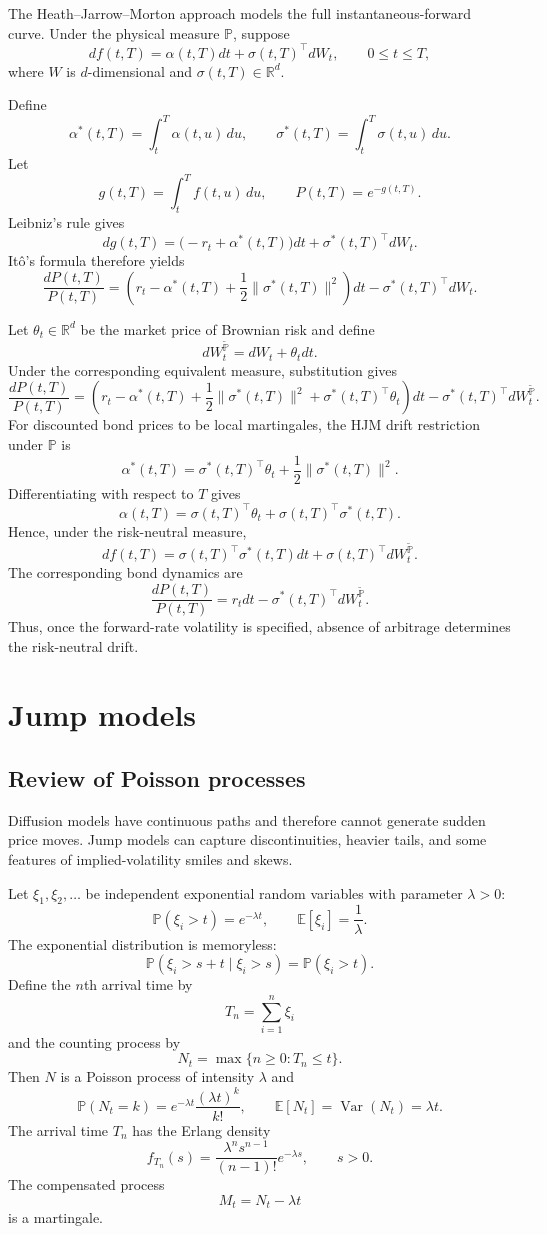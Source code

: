 The Heath--Jarrow--Morton approach models the full instantaneous-forward curve. Under the physical measure $\mathbb{P}$, suppose
\[
df(t,T)
=\alpha(t,T)dt+\sigma(t,T)^\top dW_t,
\qquad 0\leq t\leq T,
\]
where $W$ is $d$-dimensional and $\sigma(t,T)\in\mathbb{R}^d$.

Define
\[
\alpha^*(t,T)=\int_t^T\alpha(t,u)\,du,
\qquad
\sigma^*(t,T)=\int_t^T\sigma(t,u)\,du.
\]
Let
\[
g(t,T)=\int_t^Tf(t,u)\,du,
\qquad
P(t,T)=e^{-g(t,T)}.
\]
Leibniz's rule gives
\[
dg(t,T)
=\bigl(-r_t+\alpha^*(t,T)\bigr)dt
 +\sigma^*(t,T)^\top dW_t.
\]
It\^o's formula therefore yields
\[
\boxed{
\frac{dP(t,T)}{P(t,T)}
=\left(
 r_t-\alpha^*(t,T)
 +\frac12\|\sigma^*(t,T)\|^2
 \right)dt
-\sigma^*(t,T)^\top dW_t.}
\]

Let $\theta_t\in\mathbb{R}^d$ be the market price of Brownian risk and define
\[
dW_t^{\widetilde{\mathbb{P}}}=dW_t+\theta_tdt.
\]
Under the corresponding equivalent measure, substitution gives
\[
\frac{dP(t,T)}{P(t,T)}
=\left(
 r_t-\alpha^*(t,T)
 +\frac12\|\sigma^*(t,T)\|^2
 +\sigma^*(t,T)^\top\theta_t
 \right)dt
-\sigma^*(t,T)^\top dW_t^{\widetilde{\mathbb{P}}}.
\]
For discounted bond prices to be local martingales, the HJM drift restriction under $\mathbb{P}$ is
\[
\boxed{
\alpha^*(t,T)
=\sigma^*(t,T)^\top\theta_t
 +\frac12\|\sigma^*(t,T)\|^2.}
\]
Differentiating with respect to $T$ gives
\[
\alpha(t,T)
=\sigma(t,T)^\top\theta_t
 +\sigma(t,T)^\top\sigma^*(t,T).
\]
Hence, under the risk-neutral measure,
\[
\boxed{
df(t,T)
=\sigma(t,T)^\top\sigma^*(t,T)dt
 +\sigma(t,T)^\top dW_t^{\widetilde{\mathbb{P}}}.}
\]
The corresponding bond dynamics are
\[
\boxed{
\frac{dP(t,T)}{P(t,T)}
=r_tdt-\sigma^*(t,T)^\top dW_t^{\widetilde{\mathbb{P}}}.}
\]
Thus, once the forward-rate volatility is specified, absence of arbitrage determines the risk-neutral drift.

\section{Jump models}

\subsection{Review of Poisson processes}

Diffusion models have continuous paths and therefore cannot generate sudden price moves. Jump models can capture discontinuities, heavier tails, and some features of implied-volatility smiles and skews.

Let $\xi_1,\xi_2,\ldots$ be independent exponential random variables with parameter $\lambda>0$:
\[
\mathbb{P}(\xi_i>t)=e^{-\lambda t},
\qquad
\mathbb{E}[\xi_i]=\frac1\lambda.
\]
The exponential distribution is memoryless:
\[
\mathbb{P}(\xi_i>s+t\mid\xi_i>s)
=\mathbb{P}(\xi_i>t).
\]
Define the $n$th arrival time by
\[
T_n=\sum_{i=1}^n\xi_i
\]
and the counting process by
\[
N_t=\max\{n\geq0:T_n\leq t\}.
\]
Then $N$ is a Poisson process of intensity $\lambda$ and
\[
\mathbb{P}(N_t=k)
=e^{-\lambda t}\frac{(\lambda t)^k}{k!},
\qquad
\mathbb{E}[N_t]=\operatorname{Var}(N_t)=\lambda t.
\]
The arrival time $T_n$ has the Erlang density
\[
f_{T_n}(s)
=\frac{\lambda^n s^{n-1}}{(n-1)!}e^{-\lambda s},
\qquad s>0.
\]
The compensated process
\[
M_t=N_t-\lambda t
\]
is a martingale.

